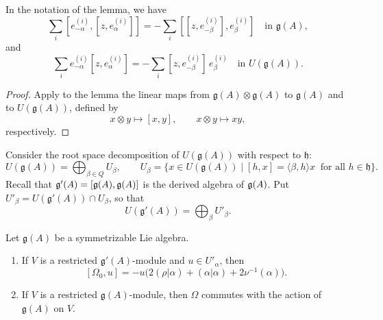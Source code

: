 \documentclass[12pt]{article}
\begin{document}
\begin{corollary}
    In the notation of the lemma, we have
    \[
        \sum_i [e_{-\alpha}^{(i)},[z,e_\alpha^{(i)}]]
        = -\sum_i [[z,e_{-\beta}^{(i)}],e_\beta^{(i)}] \quad \text{in } \mathfrak{g}(A),
    \]
    and
    \[
        \sum_i e_{-\alpha}^{(i)}[z,e_\alpha^{(i)}]
        = -\sum_i [z,e_{-\beta}^{(i)}]\, e_\beta^{(i)} \quad \text{in } U(\mathfrak{g}(A)).
    \]
\end{corollary}

\begin{proof}
    Apply to the lemma the linear maps from $\mathfrak{g}(A)\otimes \mathfrak{g}(A)$ to $\mathfrak{g}(A)$ and to $U(\mathfrak{g}(A))$, defined by
    \[
        x\otimes y \mapsto [x,y],
        \qquad
        x\otimes y \mapsto xy,
    \]
    respectively.
\end{proof}

Consider the root space decomposition of $U(\mathfrak{g}(A))$ with respect to $\mathfrak{h}$:
\[
    U(\mathfrak{g}(A)) = \bigoplus_{\beta \in Q} U_\beta, \qquad
    U_\beta = \{ x \in U(\mathfrak{g}(A)) \mid [h,x] = \langle \beta,h\rangle x \;\;\text{for all } h \in \mathfrak{h}\}.
\]
Recall that $\mathfrak{g}'(A) = [\mathfrak{g}(A),\mathfrak{g}(A)]$ is the derived algebra of $\mathfrak{g}(A)$. Put $U'_\beta = U(\mathfrak{g}'(A)) \cap U_\beta$, so that
\[
    U(\mathfrak{g}'(A)) = \bigoplus_\beta U'_\beta.
\]

\begin{theorem}[\label{thm:Casimir-commutes}]
    Let $\mathfrak{g}(A)$ be a symmetrizable Lie algebra.
    \begin{enumerate}[label=\alph*)]
        \item If $V$ is a restricted $\mathfrak{g}'(A)$-module and $u \in U'_\alpha$, then
              \[
                  [\Omega_0,u] = -u\Big( 2(\rho|\alpha) + (\alpha|\alpha) + 2\nu^{-1}(\alpha)\Big).
              \]
        \item If $V$ is a restricted $\mathfrak{g}(A)$-module, then $\Omega$ commutes with the action of $\mathfrak{g}(A)$ on $V$.
    \end{enumerate}
\end{theorem}
\end{document}
